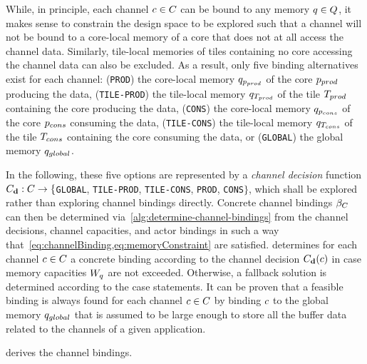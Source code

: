 \par
While, in principle, each channel $c \in C$ can be bound to any memory $q \in Q$, it makes sense to constrain the design space to be explored such that a channel will not be bound to a core-local memory of a core that does not at all access the channel data.
Similarly, tile-local memories of tiles containing no core accessing the channel data can also be excluded.
As a result, only five binding alternatives exist for each channel:
(\texttt{PROD}) the core-local memory $q_{p_{prod}}$ of the core $p_{prod}$ producing the data,
(\texttt{TILE-PROD}) the tile-local memory $q_{T_{prod}}$ of the tile $T_{prod}$ containing the core producing the data,
(\texttt{CONS}) the core-local memory  $q_{p_{cons}}$ of the core $p_{cons}$ consuming the data,
(\texttt{TILE-CONS}) the tile-local memory $q_{T_{cons}}$ of the tile $T_{cons}$ containing the core consuming the data, or
(\texttt{GLOBAL}) the global memory $q_{global}$.
\par
In the following, these five options are represented by a \emph{channel decision} function $C_\mathtt{\mathbf{d}}: C \rightarrow \{$\texttt{GLOBAL}, \texttt{TILE-PROD}, \texttt{TILE-CONS}, \texttt{PROD}, \texttt{CONS}$\}$, which shall be explored rather than exploring channel bindings directly.
Concrete channel bindings $\beta_C$ can then be determined via~\cref{alg:determine-channel-bindings} from the channel decisions, channel capacities, and actor bindings in such a way that~\cref{eq:channelBinding,eq:memoryConstraint} are satisfied.
 determines for each channel $c \in C$ a concrete binding according to the channel decision $C_\mathtt{\mathbf{d}}(c)$ in case memory capacities $W_{q}$ are not exceeded.
Otherwise, a fallback solution is determined according to the case statements.
It can be proven that a feasible binding is always found for each channel $c \in C$ by binding $c$ to the global memory $q_{global}$ that is assumed to be large enough to store all the buffer data related to the channels of a given application.
\par
{} derives the channel bindings. 
